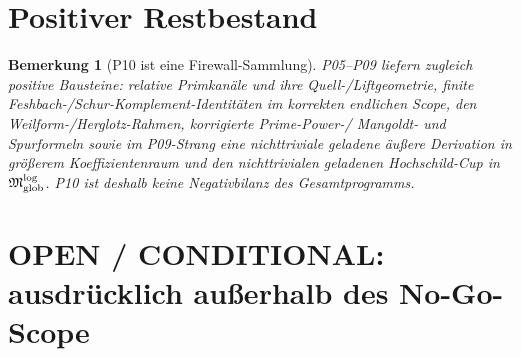 \documentclass[11pt,a4paper]{amsart}
\newtheorem{remark}[theorem]{Bemerkung}
\begin{document}
\section{Positiver Restbestand}

\begin{remark}[P10 ist eine Firewall-Sammlung]
P05--P09 liefern zugleich positive Bausteine: relative Primkanäle und ihre
Quell-/Liftgeometrie, finite Feshbach-/Schur-Komplement-Identitäten im korrekten
endlichen Scope, den Weilform-/Herglotz-Rahmen, korrigierte Prime-Power-/
Mangoldt- und Spurformeln sowie im P09-Strang eine nichttriviale geladene
äußere Derivation in größerem Koeffizientenraum und den nichttrivialen geladenen
Hochschild-Cup in $\mathfrak M_{\rm glob}^{\log}$. P10 ist deshalb keine
Negativbilanz des Gesamtprogramms.
\end{remark}

\section{OPEN / CONDITIONAL: ausdrücklich außerhalb des No-Go-Scope}
\end{document}
